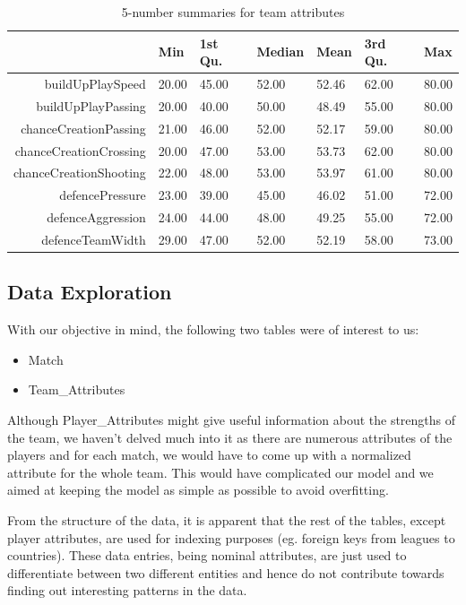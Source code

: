 \documentclass[11pt]{article}
\begin{document}
\begin{table}[ht]
\centering
\begin{tabular}{rllllll}
  \hline
                 & Min     & 1st Qu. & Median  & Mean    & 3rd Qu. & Max \\
  \hline
buildUpPlaySpeed & 20.00   & 45.00   & 52.00   & 52.46   & 62.00   & 80.00   \\
  buildUpPlayPassing & 20.00   & 40.00   & 50.00   & 48.49   & 55.00   & 80.00   \\
  chanceCreationPassing & 21.00   & 46.00   & 52.00   & 52.17   & 59.00   & 80.00   \\
  chanceCreationCrossing & 20.00   & 47.00   & 53.00   & 53.73   & 62.00   & 80.00   \\
  chanceCreationShooting & 22.00   & 48.00   & 53.00   & 53.97   & 61.00   & 80.00   \\
  defencePressure & 23.00   & 39.00   & 45.00   & 46.02   & 51.00   & 72.00   \\
  defenceAggression & 24.00   & 44.00   & 48.00   & 49.25   & 55.00   & 72.00   \\
  defenceTeamWidth & 29.00   & 47.00   & 52.00   & 52.19   & 58.00   & 73.00   \\
   \hline
\end{tabular}
\caption{5-number summaries for team attributes}
\label{tab:desc-stat}
\end{table}

\subsection{Data Exploration}
With our objective in mind, the following two tables were of interest to us:
\begin{itemize}
  \setlength\itemsep{0em}
  \item Match
  \item Team\_Attributes
\end{itemize}
Although Player\_Attributes might give useful information about the strengths of the team, we haven't delved much into it as there are numerous attributes of the players and for each match, we would have to come up with a normalized attribute for the whole team.
This would have complicated our model and we aimed at keeping the model as simple as possible to avoid overfitting.

From the structure of the data, it is apparent that the rest of the tables, except player attributes, are used for indexing purposes (eg. foreign keys from leagues to countries).
These data entries, being nominal attributes, are just used to differentiate between two different entities and hence do not contribute towards finding out interesting patterns in the data.
\end{document}
